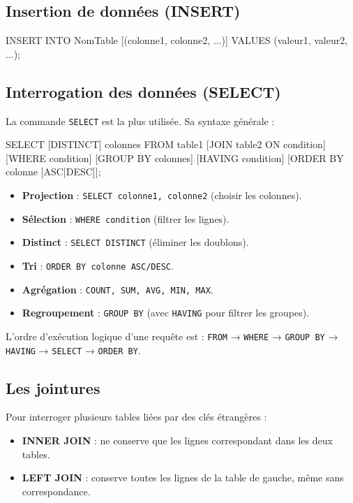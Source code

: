 \subsection{Insertion de données (INSERT)}
\begin{definition}
\begin{sqlcode}
INSERT INTO NomTable [(colonne1, colonne2, ...)]
VALUES (valeur1, valeur2, ...);
\end{sqlcode}
\end{definition}

\subsection{Interrogation des données (SELECT)}
La commande \texttt{SELECT} est la plus utilisée. Sa syntaxe générale :
\begin{sqlcode}
SELECT [DISTINCT] colonnes
FROM table1 [JOIN table2 ON condition]
[WHERE condition]
[GROUP BY colonnes]
[HAVING condition]
[ORDER BY colonne [ASC|DESC]];
\end{sqlcode}

\begin{propriete}
\begin{itemize}
    \item \textbf{Projection} : \texttt{SELECT colonne1, colonne2} (choisir les colonnes).
    \item \textbf{Sélection} : \texttt{WHERE condition} (filtrer les lignes).
    \item \textbf{Distinct} : \texttt{SELECT DISTINCT} (éliminer les doublons).
    \item \textbf{Tri} : \texttt{ORDER BY colonne ASC/DESC}.
    \item \textbf{Agrégation} : \texttt{COUNT, SUM, AVG, MIN, MAX}.
    \item \textbf{Regroupement} : \texttt{GROUP BY} (avec \texttt{HAVING} pour filtrer les groupes).
\end{itemize}
\end{propriete}

\begin{aretenir}
L'ordre d'exécution logique d'une requête est : \texttt{FROM} → \texttt{WHERE} → \texttt{GROUP BY} → \texttt{HAVING} → \texttt{SELECT} → \texttt{ORDER BY}.
\end{aretenir}

\subsection{Les jointures}
Pour interroger plusieurs tables liées par des clés étrangères :
\begin{itemize}
    \item \textbf{INNER JOIN} : ne conserve que les lignes correspondant dans les deux tables.
    \item \textbf{LEFT JOIN} : conserve toutes les lignes de la table de gauche, même sans correspondance.
\end{itemize}

